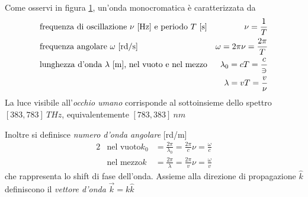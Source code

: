 \begin{figure}[t]
	\label{chapter1:spectrum}
\end{figure}
%
Come osservi in figura \ref{chapter1:spectrum}, un'onda monocromatica \`e caratterizzata da
\begin{alignat}{2}
	&\text{frequenza di oscillazione $\nu$ [\si{Hz}] e periodo $T$ [\si{s}]} & \nu = \frac{1}{T} \\
	&\text{frequenza angolare $\omega$ [\si{rd/s}]} & \omega = 2\pi\nu = \frac{2\pi}{T} \\
	&\text{lunghezza d'onda $\lambda$ [\si{m}], nel vuoto e nel mezzo} & \lambda_0 = cT = \frac{c}{\ni} \\
	& & \lambda = vT = \frac{v}{\nu}
\end{alignat}
La luce visibile all'\textit{occhio umano} corrisponde al sottoinsieme dello spettro $[383, 783]\ \si{THz}$, equivalentemente $[783, 383]\ \si{nm}$\par
Inoltre si definisce \textit{numero d'onda angolare} [\si{rd/m}]
\begin{alignat}{2}
	& \text{nel vuoto} k_0 &= \frac{2\pi}{\lambda_0} = \frac{2\pi}{c}\nu = \frac{\omega}{c} \\
	& \text{nel mezzo}  k &= \frac{2\pi}{\lambda} = \frac{2\pi}{v}\nu = \frac{\omega}{v}
\end{alignat}
che rappresenta lo shift di fase dell'onda. 
Assieme alla direzione di propagazione $\hat{k}$ definiscono il \textit{vettore d'onda} $\overrightarrow{k} = k \hat{k}$\par
